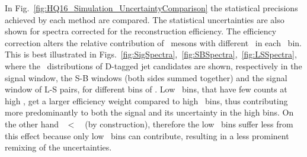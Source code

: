 In Fig.~\ref{fig:HQ16_Simulation_UncertaintyComparison} the statistical precisions achieved by each method are compared. 
The statistical uncertainties are also shown for spectra corrected for the reconstruction efficiency. The efficiency correction alters the 
relative contribution of \Dzero\ mesons with different \pt\ in each \ptchjet\ bin. This is best illustrated in Figs.~\ref{fig:SigSpectra},~\ref{fig:SBSpectra},~\ref{fig:LSSpectra}, where the \ptchjetdet\ distributions
of D-tagged jet candidates are shown, respectively in the signal window, the S-B windows (both sides summed together) and the signal window of L-S pairs,
for different bins of \ptd. Low \ptd\ bins, that have few counts at high \ptchjetdet, get a larger efficiency weight compared to high \ptd\ bins, thus contributing more predominantly to both the signal and
its uncertainty in the high \ptchjetdet bins. On the other hand \ptd~$<$~\ptchjetdet\ (by construction), therefore the low \ptchjetdet\ bins suffer less from this effect because only low \ptd\ bins can contribute,
resulting in a less prominent remixing of the uncertainties.

